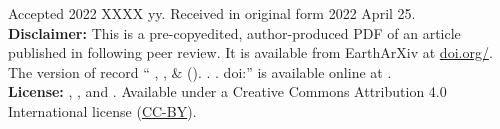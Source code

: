 \documentclass[twocolumn,10pt]{article}
\newcommand{\Author}{%
  \WesselShort{}, \WattsShort{}, \KimShort{} \& \SandwellShort{}
}
\newcommand{\AuthorLong}{%
  \Wessel{}, \Watts{}, \Kim{} and \Sandwell{}
}
\newcommand{\AuthorAffil}{%
    {\large
     \Wessel$^{1}$ \orcidlink{\WesselORCID},
     \Watts$^{2}$ \orcidlink{\WattsORCID},
     \Kim$^{3}$ \orcidlink{\KimORCID},
      and
      \Sandwell$^{3}$ \orcidlink{\SandwellORCID}
    }
    \\[0.4cm]
    {\small $^{1}$\SOEST} \\
    {\small $^{2}$\OXFORD} \\
    {\small $^{3}$\CHUNGNAM} \\
    {\small $^{4}$\UCSD} \\
    {\small\WesselMail} \\
}
\begin{document}
\title{\Title}
\author{\AuthorAffil}
\date{
    \normalsize
    \Year
}

\noindent
Accepted 2022 XXXX yy. Received in original form 2022 April 25.
\\[0.5cm]
\noindent
\textbf{Disclaimer:}
This is a pre-copyedited, author-produced PDF of an article
published in \Journal{} following peer review.
It is available from EarthArXiv at
\href{https://doi.org/\PreprintDOI}{doi.org/\PreprintDOI}.
The version of record
``\Author{} (\Year{}). \Title{}. \Journal{}. doi:\DOI{}''
is available online at \DOILink{}.
\\[0.5cm]
\noindent
\textbf{License:}
\textcopyright{} \Year{} \AuthorLong{}.
Available under a Creative Commons Attribution 4.0 International license
(\href{https://creativecommons.org/licenses/by/4.0/}{CC-BY}).


\begin{abstract}
    
\end{abstract}











\end{document}
